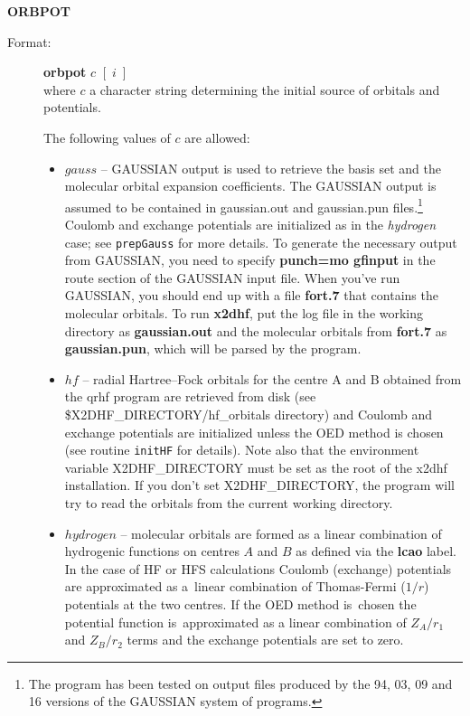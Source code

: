 \documentclass[10pt,a4paper]{article}
\newcommand{\ft}[1]{\texttt{#1}}
\begin{document}
\begin{description}
\item \textbf{ORBPOT}
\begin{description}
\item[Format:] \textbf{orbpot} $c$ $[\; i \;]$\\
  where $c$ a character string determining the initial source of orbitals
  and potentials.

  The following values of $c$ are allowed:
\begin{itemize}

\item $gauss$ -- GAUSSIAN output is used to retrieve the basis set and the
  molecular orbital expansion coefficients. The GAUSSIAN output is assumed
  to be contained in gaussian.out and gaussian.pun files.\footnote{The
    program has been tested on output files produced by the 94, 03, 09 and
    16 versions of the GAUSSIAN system of programs.} Coulomb and exchange
  potentials are initialized as in the \textsl{hydrogen} case; see
  \ft{prepGauss} for more details. To generate the necessary output from
  GAUSSIAN, you need to specify {\bf punch=mo gfinput} in the route section
  of the GAUSSIAN input file. When you've run GAUSSIAN, you should end up
  with a file {\bf fort.7} that contains the molecular orbitals. To run
  {\bf x2dhf}, put the log file in the working directory as {\bf
    gaussian.out} and the molecular orbitals from {\bf fort.7} as {\bf
    gaussian.pun}, which will be parsed by the program.

\item $hf$ -- radial Hartree--Fock orbitals for the centre A and B obtained
  from the qrhf program are retrieved from disk (see
  \$X2DHF\_DI\-REC\-TO\-RY/\-hf\_orbitals directory) and Coulomb and
  exchange potentials are initialized unless the OED method is chosen (see
  routine \ft{initHF} for details).  Note also that the environment
  variable X2DHF\_DIRECTORY must be set as the root of the x2dhf
  installation. If you don't set X2DHF\_DIRECTORY, the program will try to
  read the orbitals from the current working directory.
  
\item $hydrogen$ -- molecular orbitals are formed as a linear combination
  of hydrogenic functions on centres $A$ and $B$ as defined via the
  \textbf{lcao} label. In the case of HF or HFS calculations Coulomb
  (exchange) potentials are approximated as a~linear combination of
  Thomas-Fermi ($1/r$) potentials at the two centres. If the OED method
  is~chosen the potential function is~approximated as a linear combination
  of $Z_A/r_1$ and $Z_B/r_2$ terms and the exchange potentials are set to
  zero.


\end{itemize}
\end{description}
\end{description}
\end{document}
